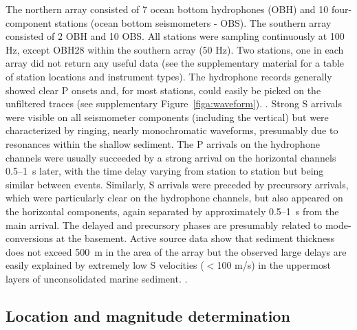\documentclass[reviewcopy]{elsarticle}
\begin{document}
The northern array consisted of 7 ocean bottom hydrophones (OBH) and 10 four-component stations (ocean
bottom seismometers - OBS).
   The southern array consisted of 2 OBH and 10 OBS.  All stations
   were sampling continuously at 100 Hz, except OBH28 within the
   southern array (50 Hz). Two
   stations, one in each array did not return any useful data (see
   the supplementary material for a table of station locations and
   instrument types).
   The hydrophone records generally showed clear
   P onsets and, for most stations, could easily be picked on
   the unfiltered traces (see  supplementary Figure~\ref{figa:waveform}).
.  Strong S arrivals were visible on all
   seismometer components (including the vertical) but were
   characterized by ringing, nearly monochromatic waveforms, presumably due to resonances within the shallow
   sediment. The P arrivals on the hydrophone channels were usually
   succeeded by a strong arrival on the horizontal channels 0.5--1~s
   later, with the time delay varying from station to station but
   being similar between events.  Similarly, S arrivals were preceded
   by precursory arrivals, which were particularly clear on the hydrophone
   channels, but also appeared on the horizontal components, again
   separated by approximately 0.5--1~s from the main arrival.  The
   delayed and precursory phases are presumably related to
   mode-conversions at the basement. Active source data show that sediment
   thickness does not exceed 500~m in the area of the array
   \citep{ifmgeomar02} but the observed large delays are easily
   explained by extremely low S velocities ($<$100 m/s) in the
   uppermost layers of unconsolidated marine sediment. .

\subsection{Location and magnitude determination}
\end{document}

